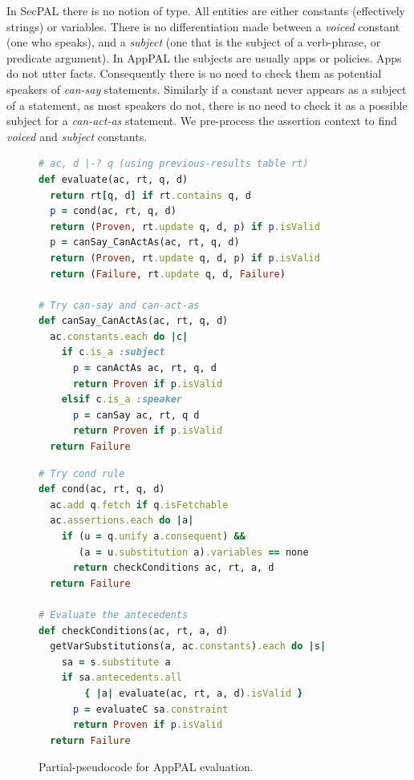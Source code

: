 \documentclass[twoside,letterpaper]{soups}
\begin{document}
In SecPAL there is no notion of type.
All entities are either constants (effectively strings) or variables.
There is no differentiation made between a \emph{voiced} constant (one who speaks),
and a \emph{subject} (one that is the subject of a verb-phrase, or predicate argument).
In AppPAL the subjects are usually apps or policies.
Apps do not utter facts.
Consequently there is no need to check them as potential speakers of \emph{can-say} statements.
Similarly if a constant never appears as a subject of a statement, as most speakers do not,
  there is no need to check it as a possible subject for a \emph{can-act-as} statement.
We pre-process the assertion context to find \emph{voiced} and \emph{subject} constants.

\begin{figure}
\begin{minipage}[b]{0.5\linewidth}
\begin{lstlisting}[language=Ruby, basicstyle=\ttfamily\scriptsize, keywordstyle=\scriptsize\slshape, columns=flexible]
# ac, d |-? q (using previous-results table rt)
def evaluate(ac, rt, q, d)
  return rt[q, d] if rt.contains q, d
  p = cond(ac, rt, q, d)
  return (Proven, rt.update q, d, p) if p.isValid
  p = canSay_CanActAs(ac, rt, q, d)
  return (Proven, rt.update q, d, p) if p.isValid
  return (Failure, rt.update q, d, Failure)

# Try can-say and can-act-as
def canSay_CanActAs(ac, rt, q, d)
  ac.constants.each do |c|
    if c.is_a :subject
      p = canActAs ac, rt, q, d
      return Proven if p.isValid
    elsif c.is_a :speaker
      p = canSay ac, rt, q d
      return Proven if p.isValid
  return Failure
\end{lstlisting}
\end{minipage}
\begin{minipage}[b]{0.5\linewidth}
\begin{lstlisting}[language=Ruby, basicstyle=\ttfamily\scriptsize, keywordstyle=\scriptsize\slshape, columns=flexible]
# Try cond rule
def cond(ac, rt, q, d)
  ac.add q.fetch if q.isFetchable
  ac.assertions.each do |a|
    if (u = q.unify a.consequent) &&
       (a = u.substitution a).variables == none
      return checkConditions ac, rt, a, d
  return Failure

# Evaluate the antecedents
def checkConditions(ac, rt, a, d)
  getVarSubstitutions(a, ac.constants).each do |s|
    sa = s.substitute a
    if sa.antecedents.all
        { |a| evaluate(ac, rt, a, d).isValid }
      p = evaluateC sa.constraint
      return Proven if p.isValid
  return Failure
\end{lstlisting}
\end{minipage}
\caption{Partial-pseudocode for AppPAL evaluation.}
\label{fig:pseudocode}
\end{figure}
\end{document}
